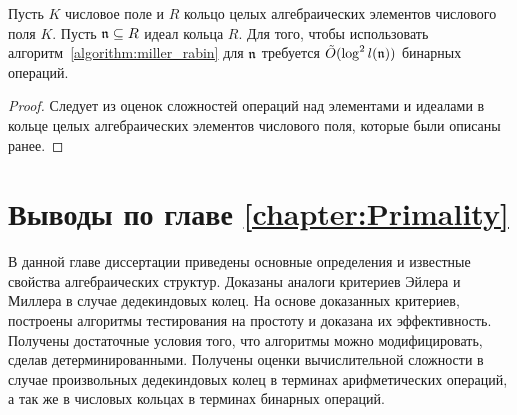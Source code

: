 \documentclass[_00_dissertation.tex]{subfiles}
\begin{document}
\begin{proposition}
    Пусть $K$ числовое поле и $R$ кольцо целых алгебраических элементов числового поля $K$.
    Пусть $\mathfrak{n} \subseteq R$ идеал кольца $R$.
    Для того, чтобы использовать алгоритм~\ref{algorithm:miller_rabin} для $\mathfrak{n}$ требуется $\tilde{O}(\log^2 l(\mathfrak{n}))$ бинарных операций.
\end{proposition}
\begin{proof}
    Следует из оценок сложностей операций над элементами и идеалами в кольце целых алгебраических элементов числового поля, которые были описаны ранее.
\end{proof}

\section*{Выводы по главе \ref{chapter:Primality}}

В данной главе диссертации приведены основные определения и известные свойства алгебраических структур.
Доказаны аналоги критериев Эйлера и Миллера в случае дедекиндовых колец.
На основе доказанных критериев, построены алгоритмы тестирования на простоту и доказана их эффективность.
Получены достаточные условия того, что алгоритмы можно модифицировать, сделав детерминированными.
Получены оценки вычислительной сложности в случае произвольных дедекиндовых колец в терминах арифметических операций, а так же в числовых кольцах в терминах бинарных операций.

\onlyinsubfile{
    
    
}
\end{document}
